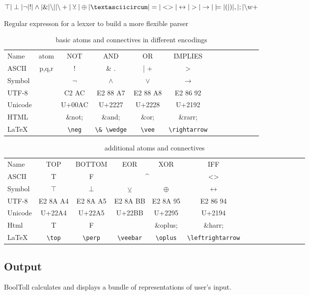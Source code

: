 \begin{table}[htdp]
\begin{center}%
$\top | \perp 
| \neg | !
| \wedge | \&
| {\setminus}| | {\setminus}+
| \veebar | \oplus | \textasciicircum
| = | <> | \leftrightarrow 
| > | \rightarrow | \models
| ( | ) | , | ; 
| {\setminus}w+$ %
\caption{Regular expresson for a lexxer to build a more flexible parser}
\end{center}
\label{tab:REGEX}
\end{table}%

\begin{table}[htdp]
\begin{center}
\begin{tabular}{l|c|c|c|cc|c|c|c|c|c|c|c|}
Name	& atom & NOT		& AND		& OR		&  IMPLIES \\
ASCII 	& p,q,r & ! 			& \& \quad .	& |  \quad +			&> 	\\
Symbol  	&& $\neg$		& $\wedge$	& {$\vee$}		&$\rightarrow$ \\ 
UTF-8	&& C2 AC		& E2 88 A7	& {E2 88 A8}	&E2 86 92\\
Unicode	&& U+00AC 	& U+2227		& {U+2228}	&U+2192\\
HTML	&& \&not;		& \&and;		& \&or;		& \&rarr;  \\
LaTeX	&& \verb+\neg+	& \verb+\& \wedge+ & \verb+\vee+ & \verb+\rightarrow+ 
\end{tabular}
\caption{basic atoms and connectives in different encodings}
\end{center}
\label{tab:BASICSYMBOLS}
\end{table}%

\begin{table}[htdp]
\begin{center}
\begin{tabular}{l|c|c|cc|cccccccccc}
Name & TOP			& BOTTOM	& EOR & XOR		& IFF \\	
ASCII & T \quad 1	& F  \quad 0	& \multicolumn{2}{c|}{\textasciicircum} 	& <> \\
Symbol &$\top$		& $\perp$		& $\veebar$ 	&$\oplus$   			&$ \leftrightarrow$\\
UTF-8 & E2 8A A4	& E2 8A A5	& E2 8A BB	& E2 8A 95			&E2 86 94\\
Unicode & U+22A4		& U+22A5		& U+22BB	& U+2295				&U+2194\\
Html & T			& F			&			& \&oplus;				& \&harr;\\
LaTeX & \verb+\top+	& \verb+\perp+	& \verb+\veebar+ & \verb+\oplus+	& \verb+\leftrightarrow+
\end{tabular}
\caption{additional atoms and connectives}
\end{center}
\label{tab:ADDITIONALSYMBOLS}
\end{table}%


\subsection{Output}

BoolToll calculates and displays a bundle of representations of user's input. 


